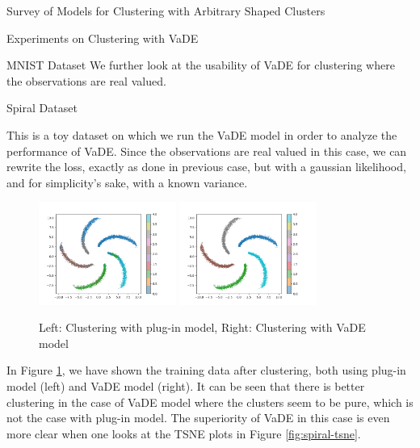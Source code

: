 \documentclass{article}
\begin{document}
\begin{psection}{Survey of Models for Clustering with Arbitrary Shaped Clusters}
\begin{psubsection}{Experiments on Clustering with VaDE}
\begin{pssubsection}{MNIST Dataset}
			We further look at the usability of VaDE for clustering where the observations are real valued.
		\end{pssubsection}

		\begin{pssubsection}{Spiral Dataset}

			This is a toy dataset on which we run the VaDE model in order to analyze the performance of VaDE. Since the observations are real valued in this case, we can rewrite the loss, exactly as done in previous case, but with a gaussian likelihood, and for simplicity's sake, with a known variance.

			\begin{figure}[h!]
				\centering
				\includegraphics[width=0.4\textwidth, trim={2.8cm 1.8cm 5.65cm 2cm}, clip]{includes/plots/spiral/clustered-gmm.png}
				\hspace{0.5cm}
				\includegraphics[width=0.4\textwidth, trim={2.8cm 1.8cm 5.65cm 2cm}, clip]{includes/plots/spiral/clustered-vade.png}
				\caption{Left: Clustering with plug-in model, Right: Clustering with VaDE model}
				\label{fig:spiral-cluster}
			\end{figure}

			In Figure \ref{fig:spiral-cluster}, we have shown the training data after clustering, both using plug-in model (left) and VaDE model (right). It can be seen that there is better clustering in the case of VaDE model where the clusters seem to be pure, which is not the case with plug-in model. The superiority of VaDE in this case is even more clear when one looks at the TSNE plots in Figure \ref{fig:spiral-tsne}.


\end{pssubsection}
\end{psubsection}
\end{psection}
\end{document}
